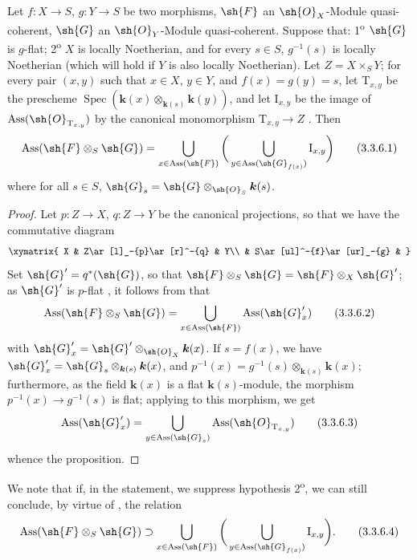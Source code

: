 \begin{proposition}[3.3.6]
\label{IV.3.3.6}
Let $f:X\to S$, $g:Y\to S$ be two morphisms, $\sh{F}$ an $\sh{O}_X$-Module quasi-coherent, $\sh{G}$ an $\sh{O}_Y$-Module quasi-coherent.
Suppose that: 1\textsuperscript{o} $\sh{G}$ is $g$-flat; 2\textsuperscript{o} $X$ is locally Noetherian, and for every $s\in S$, $g^{-1}(s)$ is locally Noetherian (which will hold if $Y$ is also locally Noetherian).
Let $Z=X\times_S Y$; for every pair $(x,y)$ such that $x\in X$, $y\in Y$,
and $f(x)=g(y)=s$, let $\mathrm{T}_{x,y}$ be the prescheme $\operatorname{Spec}(\boldsymbol{k}(x)\otimes_{\boldsymbol{k}(s)}\boldsymbol{k}(y))$, and let $\mathrm{I}_{x,y}$ be the image of $\operatorname{Ass}(\sh{O}_{\mathrm{T}_{x,y}})$ by the canonical monomorphism $\mathrm{T}_{x,y}\to Z$ .
Then
\[
\label{IV.3.3.6.1}
\operatorname{Ass}(\sh{F}\otimes_S\sh{G})=\bigcup_{x\in\operatorname{Ass}(\sh{F})}\bigg(\bigcup_{y\in\operatorname{Ass}(\sh{G}_{f(x)})}\mathrm{I}_{x,y}\bigg)
\tag{3.3.6.1}
\]
where for all $s\in S$, $\sh{G}_s=\sh{G}\otimes_{\sh{O}_S}\boldsymbol{k}(s)$.
\end{proposition}

\begin{proof}
Let $p:Z\to X$, $q:Z\to Y$ be the canonical projections, so that we have the commutative diagram
\[
\xymatrix{
X & Z\ar[l]_-{p}\ar[r]^-{q} & Y\\
& S\ar[ul]^-{f}\ar[ur]_-{g} &
}
\]
Set $\sh{G}'=q^*(\sh{G})$, so that $\sh{F}\otimes_S\sh{G}=\sh{F}\otimes_X\sh{G}'$; as $\sh{G}'$ is $p$-flat , it follows from  that
\[
\label{IV.3.3.6.2}
\operatorname{Ass}(\sh{F}\otimes_S\sh{G})=\bigcup_{x\in\operatorname{Ass}(\sh{F})}\operatorname{Ass}(\sh{G}'_x)
\tag{3.3.6.2}
\]
with $\sh{G}'_x=\sh{G}'\otimes_{\sh{O}_X}\boldsymbol{k}(x)$.
If $s=f(x)$, we have $\sh{G}'_x=\sh{G}_s\otimes_{\boldsymbol{k}(s)}\boldsymbol{k}(x)$, and $p^{-1}(x)=g^{-1}(s)\otimes_{\boldsymbol{k}(s)}\boldsymbol{k}(x)$; furthermore, as the field $\boldsymbol{k}(x)$ is a flat $\boldsymbol{k}(s)$-module, the morphism $p^{-1}(x)\to g^{-1}(s)$ is flat; applying  to this morphism, we get
\[
\label{IV.3.3.6.3}
\operatorname{Ass}(\sh{G}'_x)=\bigcup_{y\in\operatorname{Ass}(\sh{G}_s)}\operatorname{Ass}(\sh{O}_{\mathrm{T}_{x,y}})
\tag{3.3.6.3}
\]
whence the proposition.
\end{proof}

We note that if, in the statement, we suppress hypothesis 2\textsuperscript{o}, we can still conclude, by virtue of , the relation
\[
\label{IV.3.3.6.4}
\operatorname{Ass}(\sh{F}\otimes_S\sh{G})\supset\bigcup_{x\in\operatorname{Ass}(\sh{F})}\bigg(\bigcup_{y\in\operatorname{Ass}(\sh{G}_{f(x)})}\mathrm{I}_{x,y}\bigg).
\tag{3.3.6.4}
\]


